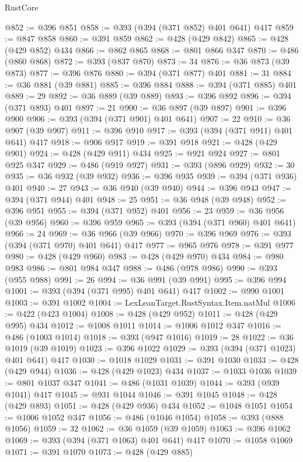 \begin{lexlean}{RustCore}
\begin{coremodule}
@852 := @396 @851
@858 := @393 (@394 (@371 @852) @401 @641) @417
@859 := @847 @858
@860 := @391 @859
@862 := @428 (@429 @842)
@865 := @428 (@429 @852) @434
@866 := @862 @865
@868 := @801 @866 @347
@870 := @486 (@860 @868)
@872 := @393 (@837 @870)
@873 := 34
@876 := @36 @873 (@39 @873)
@877 := @396 @876
@880 := @394 (@371 @877) @401
@881 := 31
@884 := @36 @881 (@39 @881)
@885 := @396 @884
@888 := @394 (@371 @885) @401
@889 := 29
@892 := @36 @889 (@39 @889)
@893 := @396 @892
@896 := @394 (@371 @893) @401
@897 := 21
@900 := @36 @897 (@39 @897)
@901 := @396 @900
@906 := @393 (@394 (@371 @901) @401 @641)
@907 := 22
@910 := @36 @907 (@39 @907)
@911 := @396 @910
@917 := @393 (@394 (@371 @911) @401 @641) @417
@918 := @906 @917
@919 := @391 @918
@921 := @428 (@429 @901)
@924 := @428 (@429 @911) @434
@925 := @921 @924
@927 := @801 @925 @347
@929 := @486 (@919 @927)
@931 := @393 (@896 @929)
@932 := 30
@935 := @36 @932 (@39 @932)
@936 := @396 @935
@939 := @394 (@371 @936) @401
@940 := 27
@943 := @36 @940 (@39 @940)
@944 := @396 @943
@947 := @394 (@371 @944) @401
@948 := 25
@951 := @36 @948 (@39 @948)
@952 := @396 @951
@955 := @394 (@371 @952) @401
@956 := 23
@959 := @36 @956 (@39 @956)
@960 := @396 @959
@965 := @393 (@394 (@371 @960) @401 @641)
@966 := 24
@969 := @36 @966 (@39 @966)
@970 := @396 @969
@976 := @393 (@394 (@371 @970) @401 @641) @417
@977 := @965 @976
@978 := @391 @977
@980 := @428 (@429 @960)
@983 := @428 (@429 @970) @434
@984 := @980 @983
@986 := @801 @984 @347
@988 := @486 (@978 @986)
@990 := @393 (@955 @988)
@991 := 26
@994 := @36 @991 (@39 @991)
@995 := @396 @994
@1001 := @393 (@394 (@371 @995) @401 @641) @417
@1002 := @990 @1001
@1003 := @391 @1002
@1004 := LexLeanTarget.RustSyntax.Item.natMul
@1006 := @422 (@423 @1004)
@1008 := @428 (@429 @952)
@1011 := @428 (@429 @995) @434
@1012 := @1008 @1011
@1014 := @1006 @1012 @347
@1016 := @486 (@1003 @1014)
@1018 := @393 (@947 @1016)
@1019 := 28
@1022 := @36 @1019 (@39 @1019)
@1023 := @396 @1022
@1029 := @393 (@394 (@371 @1023) @401 @641) @417
@1030 := @1018 @1029
@1031 := @391 @1030
@1033 := @428 (@429 @944)
@1036 := @428 (@429 @1023) @434
@1037 := @1033 @1036
@1039 := @801 @1037 @347
@1041 := @486 (@1031 @1039)
@1044 := @393 (@939 @1041) @417
@1045 := @931 @1044
@1046 := @391 @1045
@1048 := @428 (@429 @893)
@1051 := @428 (@429 @936) @434
@1052 := @1048 @1051
@1054 := @1006 @1052 @347
@1056 := @486 (@1046 @1054)
@1058 := @393 (@888 @1056)
@1059 := 32
@1062 := @36 @1059 (@39 @1059)
@1063 := @396 @1062
@1069 := @393 (@394 (@371 @1063) @401 @641) @417
@1070 := @1058 @1069
@1071 := @391 @1070
@1073 := @428 (@429 @885)

\end{coremodule}
\end{lexlean}
